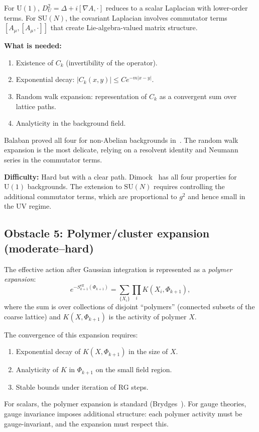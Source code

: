 \documentclass[11pt,a4paper]{article}
\theoremstyle{plain}
\theoremstyle{definition}
\theoremstyle{remark}
\newcommand{\SU}{\mathrm{SU}}
\newcommand{\U}{\mathrm{U}}
\begin{document}
For $\U(1)$, $D_U^2 = \Delta + i[\nabla A, \cdot]$
reduces to a scalar Laplacian with lower-order terms.
For $\SU(N)$, the covariant Laplacian involves
commutator terms $[A_\mu, [A_\mu, \cdot]]$ that
create Lie-algebra-valued matrix structure.

\textbf{What is needed:}
\begin{enumerate}[label=(\alph*)]
  \item Existence of $C_k$ (invertibility of the operator).
  \item Exponential decay: $|C_k(x,y)| \le C e^{-m|x-y|}$.
  \item Random walk expansion: representation of $C_k$
    as a convergent sum over lattice paths.
  \item Analyticity in the background field.
\end{enumerate}
Balaban proved all four for non-Abelian backgrounds
in~\cite{Bal85b}. The random walk expansion is the
most delicate, relying on a resolvent identity and
Neumann series in the commutator terms.

\textbf{Difficulty:} Hard but with a clear path.
Dimock~\cite{Dimock22} has all four properties for
$\U(1)$ backgrounds. The extension to $\SU(N)$ requires
controlling the additional commutator terms, which are
proportional to $g^2$ and hence small in the UV regime.

\subsection{Obstacle 5: Polymer/cluster expansion
  (moderate--hard)}

The effective action after Gaussian integration is
represented as a \emph{polymer expansion}:
\begin{equation}\label{eq:polymer}
  e^{-S_{k+1}^{\text{eff}}(\Phi_{k+1})} =
  \sum_{\{X_i\}} \prod_i K(X_i, \Phi_{k+1}),
\end{equation}
where the sum is over collections of disjoint ``polymers''
(connected subsets of the coarse lattice) and
$K(X, \Phi_{k+1})$ is the activity of polymer $X$.

The convergence of this expansion requires:
\begin{enumerate}[label=(\alph*)]
  \item Exponential decay of $K(X, \Phi_{k+1})$
    in the size of $X$.
  \item Analyticity of $K$ in $\Phi_{k+1}$ on the
    small field region.
  \item Stable bounds under iteration of RG steps.
\end{enumerate}
For scalars, the polymer expansion is standard
(Brydges~\cite{Brydges86}). For gauge theories,
gauge invariance imposes additional structure:
each polymer activity must be gauge-invariant,
and the expansion must respect this.
\end{document}
